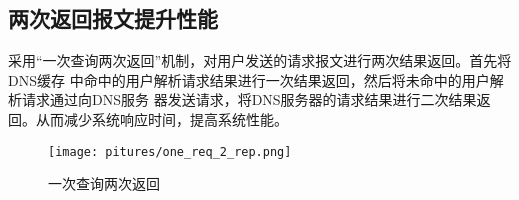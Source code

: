 \subsection{两次返回报文提升性能}
采用“一次查询两次返回”机制，对用户发送的请求报文进行两次结果返回。首先将DNS缓存
中命中的用户解析请求结果进行一次结果返回，然后将未命中的用户解析请求通过向DNS服务
器发送请求，将DNS服务器的请求结果进行二次结果返回。从而减少系统响应时间，提高系统性能。
\begin{figure}[H]                                                                                                                                       
\centering
\texttt{[image: pitures/one\_req\_2\_rep.png]}
\caption{一次查询两次返回} 
\end{figure}

%
